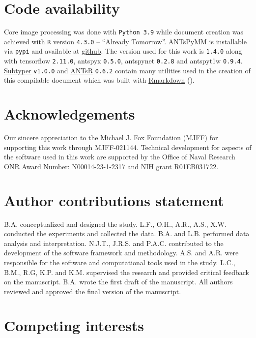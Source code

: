 \documentclass[
  table]{article}
\begin{document}
\section{Code availability}\label{code-availability}

Core image processing was done with \texttt{Python\ 3.9} while document
creation was achieved with \texttt{R} version \texttt{4.3.0} --
``Already Tomorrow''. ANTsPyMM is installable via \texttt{pypi} and
available at \href{https://github.com/stnava/ANTsPyMM}{github}. The
version used for this work is \texttt{1.4.0} along with tensorflow
\texttt{2.11.0}, antspyx \texttt{0.5.0}, antspynet \texttt{0.2.8} and
antspyt1w \texttt{0.9.4}.
\href{https://stnava.github.io/subtyper/}{Subtyper} \texttt{v1.0.0} and
\href{https://antsx.github.io/ANTsR/}{ANTsR} \texttt{0.6.2} contain many
utilities used in the creation of this compilable document which was
built with \href{https://rmarkdown.rstudio.com}{Rmarkdown}
().

\section{Acknowledgements}\label{acknowledgements}

Our sincere appreciation to the Michael J. Fox Foundation (MJFF) for
supporting this work through MJFF-021144. Technical development for
aspects of the software used in this work are supported by the Office of
Naval Research ONR Award Number: N00014-23-1-2317 and NIH grant
R01EB031722.

\section{Author contributions
statement}\label{author-contributions-statement}

B.A. conceptualized and designed the study. L.F., O.H., A.R., A.S., X.W.
conducted the experiments and collected the data. B.A. and L.B.
performed data analysis and interpretation. N.J.T., J.R.S. and P.A.C.
contributed to the development of the software framework and
methodology. A.S. and A.R. were responsible for the software and
computational tools used in the study. L.C., B.M., R.G, K.P. and K.M.
supervised the research and provided critical feedback on the
manuscript. B.A. wrote the first draft of the manuscript. All authors
reviewed and approved the final version of the manuscript.

\section{Competing interests}\label{competing-interests}
\end{document}
